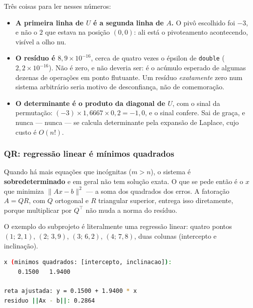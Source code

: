 Três coisas para ler nesses números:

\begin{itemize}
  \item \textbf{A primeira linha de $U$ é a segunda linha de $A$.} O pivô
        escolhido foi $-3$, e não o $2$ que estava na posição $(0,0)$: ali está o
        pivoteamento acontecendo, visível a olho nu.
  \item \textbf{O resíduo é $8{,}9 \times 10^{-16}$}, cerca de quatro vezes o
        épsilon de \texttt{double} ($2{,}2 \times 10^{-16}$). Não é zero, e não
        deveria ser: é o acúmulo esperado de algumas dezenas de operações em
        ponto flutuante. Um resíduo \emph{exatamente} zero num sistema
        arbitrário seria motivo de desconfiança, não de comemoração.
  \item \textbf{O determinante é o produto da diagonal de $U$}, com o sinal da
        permutação: $(-3) \times 1{,}6667 \times 0{,}2 = -1{,}0$, e o sinal
        confere. Sai de graça, e nunca --- nunca --- se calcula determinante pela
        expansão de Laplace, cujo custo é $O(n!)$.
\end{itemize}

\subsubsection{QR: regressão linear é mínimos quadrados}

Quando há mais equações que incógnitas ($m > n$), o sistema é
\textbf{sobredeterminado} e em geral não tem solução exata. O que se pede então
é o $x$ que minimiza $\lVert Ax - b \rVert^2$ --- a soma dos quadrados dos erros.
A fatoração $A = QR$, com $Q$ ortogonal e $R$ triangular superior, entrega isso
diretamente, porque multiplicar por $Q^\top$ não muda a norma do resíduo.

O exemplo do subprojeto é literalmente uma regressão linear: quatro pontos
$(1;\,2{,}1)$, $(2;\,3{,}9)$, $(3;\,6{,}2)$, $(4;\,7{,}8)$, duas colunas
(intercepto e inclinação).

\begin{lstlisting}[style=bt, language=bash,
    caption={Saída real de \texttt{./dist/bin/eigen\_demo}, demo 2.}]
x (minimos quadrados: [intercepto, inclinacao]):
    0.1500   1.9400

reta ajustada: y = 0.1500 + 1.9400 * x
residuo ||Ax - b||: 0.2864
\end{lstlisting}

